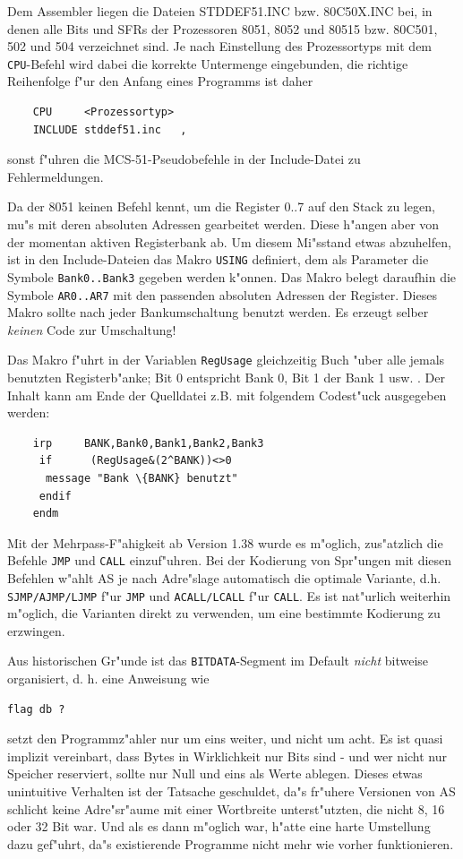 \documentclass[12pt,a4paper,twoside]{report}
\newcommand{\ii}[1]{{\it #1}}
\newcommand{\tty}[1]{{\tt #1}}
\newcommand{\asname}{AS}
\begin{document}
Dem Assembler liegen die Dateien STDDEF51.INC bzw. 80C50X.INC bei, in
denen alle Bits und SFRs der Prozessoren 8051, 8052 und 80515 bzw. 80C501,
502 und 504 verzeichnet sind.  Je nach Einstellung des Prozessortyps mit
dem \tty{CPU}-Befehl wird dabei die korrekte Untermenge eingebunden, die
richtige Reihenfolge f"ur den Anfang eines Programms ist daher
\begin{verbatim}
	CPU     <Prozessortyp>
	INCLUDE stddef51.inc   ,
\end{verbatim}
sonst f"uhren die MCS-51-Pseudobefehle in der Include-Datei zu
Fehlermeldungen.
\par
Da der 8051 keinen Befehl kennt, um die Register 0..7 auf den Stack zu
legen, mu"s mit deren absoluten Adressen gearbeitet werden.  Diese
h"angen aber von der momentan aktiven Registerbank ab.  Um diesem Mi"sstand
etwas abzuhelfen, ist in den Include-Dateien das Makro \tty{USING} definiert,
dem als Parameter die Symbole \tty{Bank0..Bank3} gegeben werden k"onnen.
Das Makro belegt daraufhin die Symbole \tty{AR0..AR7} mit den passenden
absoluten Adressen der Register.  Dieses Makro sollte nach jeder
Bankumschaltung benutzt werden.  Es erzeugt selber \ii{keinen} Code zur
Umschaltung!
\par
Das Makro f"uhrt in der Variablen \tty{RegUsage} gleichzeitig Buch "uber
alle jemals benutzten Registerb"anke; Bit 0 entspricht Bank 0, Bit 1 der
Bank 1 usw. .  Der Inhalt kann am Ende der Quelldatei z.B. mit folgendem
Codest"uck ausgegeben werden:
\begin{verbatim}
	irp     BANK,Bank0,Bank1,Bank2,Bank3
	 if      (RegUsage&(2^BANK))<>0
	  message "Bank \{BANK} benutzt"
	 endif
	endm
\end{verbatim}
Mit der Mehrpass-F"ahigkeit ab Version 1.38 wurde es m"oglich, zus"atzlich
die Befehle \tty{JMP} und \tty{CALL} einzuf"uhren.  Bei der Kodierung
von Spr"ungen mit diesen Befehlen w"ahlt \asname{} je nach Adre"slage automatisch
die optimale Variante, d.h. \tty{SJMP/AJMP/LJMP} f"ur \tty{JMP} und
\tty{ACALL/LCALL} f"ur \tty{CALL}.  Es ist nat"urlich weiterhin m"oglich,
die Varianten direkt zu verwenden, um eine bestimmte Kodierung zu erzwingen.

Aus historischen Gr"unde ist das {\tt BITDATA}-Segment im Default
{\em nicht} bitweise organisiert, d. h. eine Anweisung wie
\begin{verbatim}
flag db ?
\end{verbatim}
setzt den Programmz"ahler nur um eins weiter, und nicht um acht.  Es ist
quasi implizit vereinbart, dass Bytes in Wirklichkeit nur Bits sind - und
wer nicht nur Speicher reserviert, sollte nur Null und eins als Werte
ablegen. Dieses etwas unintuitive Verhalten ist der Tatsache geschuldet,
da"s fr"uhere Versionen von \asname{} schlicht keine Adre"sr"aume mit
einer Wortbreite unterst"utzten, die nicht 8, 16 oder 32 Bit war.  Und 
als es dann m"oglich war, h"atte eine harte Umstellung dazu gef"uhrt, da"s
existierende Programme nicht mehr wie vorher funktionieren.
\end{document}
